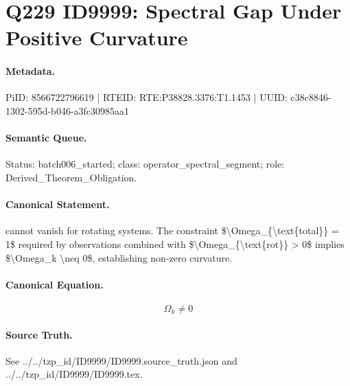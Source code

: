 \section*{Q229 ID9999: Spectral Gap Under Positive Curvature}
\paragraph{Metadata.}
PiID: 8566722796619 | RTEID: RTE:P38828.3376:T1.1453 | UUID: c38c8846-1302-595d-b046-a3fc30985aa1

\paragraph{Semantic Queue.}
Status: batch006\_started; class: operator\_spectral\_segment; role: Derived\_Theorem\_Obligation.

\paragraph{Canonical Statement.}
cannot vanish for rotating systems. The constraint \$\textbackslash{}Omega\_\{\textbackslash{}text\{total\}\} = 1\$ required by observations combined with \$\textbackslash{}Omega\_\{\textbackslash{}text\{rot\}\} > 0\$ implies \$\textbackslash{}Omega\_k \textbackslash{}neq 0\$, establishing non-zero curvature.

\paragraph{Canonical Equation.}
\[
\Omega_k \neq 0
\]

\paragraph{Source Truth.}
See ../../tzp\_id/ID9999/ID9999.source\_truth.json and ../../tzp\_id/ID9999/ID9999.tex.
